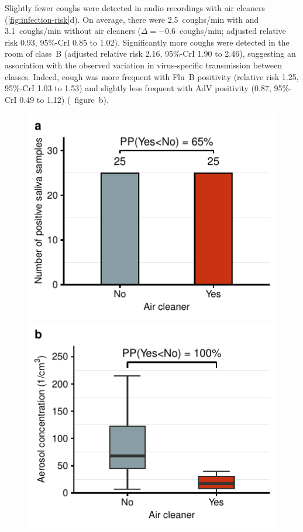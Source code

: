 \documentclass[fleqn,11pt]{wlscirep}
\begin{document}
Slightly fewer coughs were detected in audio recordings with air cleaners (\cref{fig:infection-risk}d). On average, there were 2.5~coughs/min with and 3.1~coughs/min without air cleaners ($\Delta=-$0.6~coughs/min; adjusted relative risk 0.93, 95\%-CrI 0.85 to 1.02). Significantly more coughs were detected in the room of class~B (adjusted relative risk 2.16, 95\%-CrI 1.90 to 2.46), suggesting an association with the observed variation in virus-specific transmission between classes. Indeed, cough was more frequent with Flu~B positivity (relative risk 1.25, 95\%-CrI 1.03 to 1.53) and slightly less frequent with AdV positivity (0.87, 95\%-CrI 0.49 to 1.12) (\supp~figure~b). 

\begin{figure}[!htpb]
\centering
    \includegraphics{../../results/mol-data/saliva-by-study-condition.pdf}\hspace{.5cm}
    \includegraphics{../../results/env-data/aerosol-number-boxplot.pdf}

\end{figure}
\end{document}
